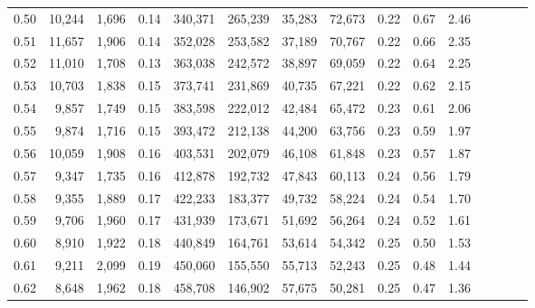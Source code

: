 \begin{tabular}{rrrcrrrrrrrrrrr}
0.50 &  10,244 &  1,696 &                                       0.14 &  340,371 &  265,239 &   35,283 &   72,673 &  0.22 &  0.67 &                         2.46 \\
0.51 &  11,657 &  1,906 &                                       0.14 &  352,028 &  253,582 &   37,189 &   70,767 &  0.22 &  0.66 &                         2.35 \\
0.52 &  11,010 &  1,708 &                                       0.13 &  363,038 &  242,572 &   38,897 &   69,059 &  0.22 &  0.64 &                         2.25 \\
0.53 &  10,703 &  1,838 &                                       0.15 &  373,741 &  231,869 &   40,735 &   67,221 &  0.22 &  0.62 &                         2.15 \\
0.54 &   9,857 &  1,749 &                                       0.15 &  383,598 &  222,012 &   42,484 &   65,472 &  0.23 &  0.61 &                         2.06 \\
0.55 &   9,874 &  1,716 &                                       0.15 &  393,472 &  212,138 &   44,200 &   63,756 &  0.23 &  0.59 &                         1.97 \\
0.56 &  10,059 &  1,908 &                                       0.16 &  403,531 &  202,079 &   46,108 &   61,848 &  0.23 &  0.57 &                         1.87 \\
0.57 &   9,347 &  1,735 &                                       0.16 &  412,878 &  192,732 &   47,843 &   60,113 &  0.24 &  0.56 &                         1.79 \\
0.58 &   9,355 &  1,889 &                                       0.17 &  422,233 &  183,377 &   49,732 &   58,224 &  0.24 &  0.54 &                         1.70 \\
0.59 &   9,706 &  1,960 &                                       0.17 &  431,939 &  173,671 &   51,692 &   56,264 &  0.24 &  0.52 &                         1.61 \\
0.60 &   8,910 &  1,922 &                                       0.18 &  440,849 &  164,761 &   53,614 &   54,342 &  0.25 &  0.50 &                         1.53 \\
0.61 &   9,211 &  2,099 &                                       0.19 &  450,060 &  155,550 &   55,713 &   52,243 &  0.25 &  0.48 &                         1.44 \\
0.62 &   8,648 &  1,962 &                                       0.18 &  458,708 &  146,902 &   57,675 &   50,281 &  0.25 &  0.47 &                         1.36 \\

\end{tabular}
